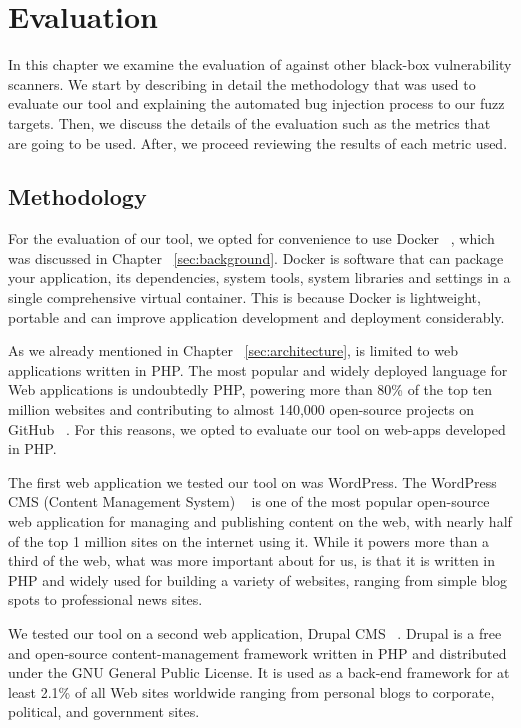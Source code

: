 \chapter{Evaluation}
\label{sec:evaluation}
\minitoc
\vspace*{1cm}

In this chapter we examine the evaluation of \pname{} against other black-box vulnerability scanners. We start by describing in detail the methodology that was used to evaluate our tool and explaining the automated bug injection process to our fuzz targets. Then, we discuss the details of the evaluation such as the metrics that are going to be used. After, we proceed reviewing the results of each metric used.

\section{Methodology}
\label{sec:dockerStack}
For the evaluation of our tool, we opted for convenience to use Docker ~\cite{docker_def}, which was discussed in Chapter ~\ref{sec:background}. Docker is software that can package your application, its dependencies, system tools, system libraries and settings in a single comprehensive virtual container. This is because Docker is lightweight, portable and can improve application development and deployment considerably.

As we already mentioned in Chapter ~\ref{sec:architecture}, \pname{} is limited to web applications written in PHP. The most popular and widely deployed language for Web applications is undoubtedly PHP, powering more than 80\% of the top ten million websites and contributing to almost 140,000 open-source projects on GitHub ~\cite{githubinfo}. For this reasons, we opted to evaluate our tool on web-apps developed in PHP.

The first web application we tested our tool on was WordPress. The WordPress CMS (Content Management System) ~\cite{docker_def} is one of the most popular open-source web application for managing and publishing content on the web, with nearly half of the top 1 million sites on the internet using it. While it powers more than a third of the web, what was more important about for us, is that it is written in PHP and widely used for building a variety of websites, ranging from simple blog spots to professional news sites. 

We tested our tool on a second web application, Drupal CMS ~\cite{drupal}. Drupal is a free and open-source content-management framework written in PHP and distributed under the GNU General Public License. It is used as a back-end framework for at least 2.1\% of all Web sites worldwide ranging from personal blogs to corporate, political, and government sites.

